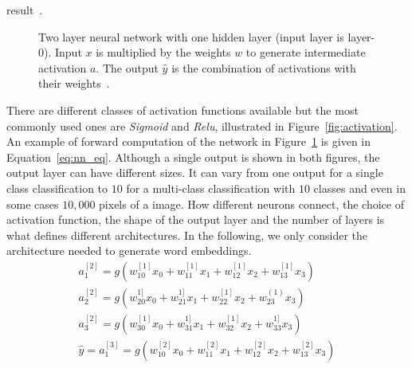 result~. \\
\begin{figure}
\centering 
\resizebox{0.65\textwidth}{0.4\textwidth}{      

}
    \caption{Two layer neural network with one hidden layer (input layer is layer-$0$). Input $x$ is multiplied by the weights $w$ to generate intermediate activation $a$. The output $\hat { y } $ is the combination of activations with their weights~.}
\label{fig:nn}
\end{figure}
\noindent
There are different classes of activation functions available but the most commonly used ones are \emph{Sigmoid} and \emph{Relu}, illustrated in Figure~\ref{fig:activation}. An example of forward computation of the network in Figure~\ref{fig:nn} is given in Equation~\ref{eq:nn_eq}. Although a single output is shown in both figures, the output layer can have different sizes. It can vary from one output for a single class classification to $10$ for a multi-class classification with $10$ classes and even in some cases $10,000$ pixels of a image. How different neurons connect, the choice of activation function, the shape of the output layer and the number of layers is what defines different architectures. In the following, we only consider the architecture needed to generate word embeddings. 
\begin{equation}
\begin{split}
a_{ 1 }^{ [2] }=g(w _{ 10 }^{ [1] }x_{ 0 }+w _{ 11 }^{ [1]}x_{ 1 }+w _{ 12 }^{ [1] }x_{ 2 }+w _{ 13 }^{ [1] }x_{ 3 })\\ 
a_{ 2 }^{ [2] }=g(w _{ 20 }^{ 1] }x_{ 0 }+w _{ 21 }^{ 1] }x_{ 1 }+w _{ 22 }^{ [1] }x_{ 2 }+w _{ 23 }^{ (1) }x_{ 3 })\\
 a_{ 3 }^{ [2] }=g(w _{ 30 }^{ [1] }x_{ 0 }+w _{ 31 }^{ 1] }x_{ 1 }+w _{ 32 }^{ [1] }x_{ 2 }+w _{ 33 }^{ 1] }x_{ 3 })\\
  \hat { y } =a_{ 1 }^{ [3] }=g(w _{ 10 }^{ [2] }x_{ 0 }+w _{ 11 }^{ [2] }x_{ 1 }+w _{ 12 }^{ [2] }x_{ 2 }+w _{ 13 }^{ [2] }x_{ 3 })
\end{split}
\label{eq:nn_eq}
\end{equation}



